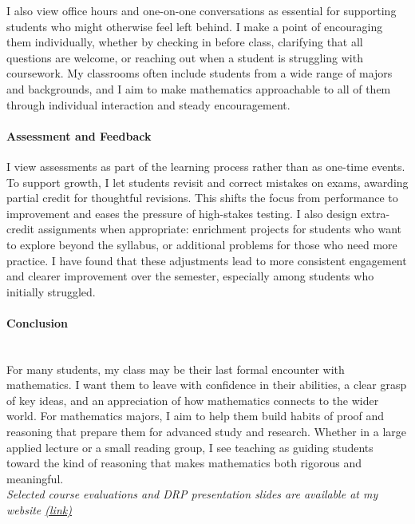 \documentclass[11pt]{article}
\begin{document}
I also view office hours and one-on-one conversations as essential for supporting students who might otherwise feel left behind. 
I make a point of encouraging them individually, whether by checking in before class, clarifying that all questions are welcome, or reaching out when a student is struggling with coursework.
My classrooms often include students from a wide range of majors and backgrounds, and I aim to make mathematics approachable to all of them through individual interaction and steady encouragement.


\paragraph{Assessment and Feedback}\quad 

I view assessments as part of the learning process rather than as one-time events. To support growth, I let students revisit and correct mistakes on exams, awarding partial credit for thoughtful revisions. This shifts the focus from performance to improvement and eases the pressure of high-stakes testing. I also design extra-credit assignments when appropriate: enrichment projects for students who want to explore beyond the syllabus, or additional problems for those who need more practice. I have found that these adjustments lead to more consistent engagement and clearer improvement over the semester, especially among students who initially struggled.



\paragraph{Conclusion} \quad \\
For many students, my class may be their last formal encounter with mathematics. I want them to leave with confidence in their abilities, a clear grasp of key ideas, and an appreciation of how mathematics connects to the wider world. For mathematics majors, I aim to help them build habits of proof and reasoning that prepare them for advanced study and research. Whether in a large applied lecture or a small reading group, I see teaching as guiding students toward the kind of reasoning that makes mathematics both rigorous and meaningful.
\\

\hfill
\noindent \textit{ \small Selected course evaluations and DRP presentation slides are available at my website \href{https://sites.google.com/view/myungsin-cho/teaching?authuser=0}{(link)}}
\end{document}
